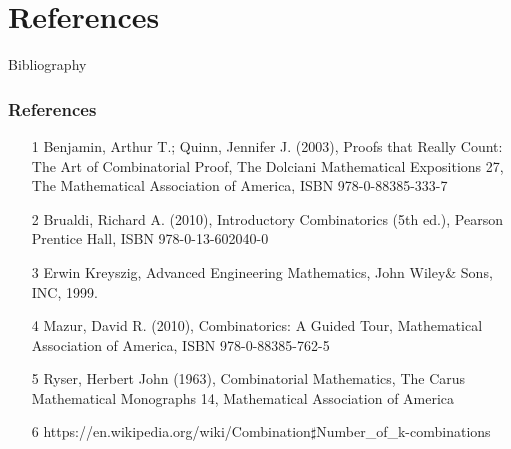 \documentclass{beamer}
\begin{document}
\section{References}
\begin{frame}{Bibliography}
\frametitle{References}
\begin{itemize}
\item[1]
Benjamin, Arthur T.; Quinn, Jennifer J. (2003), Proofs that Really Count: The Art of Combinatorial Proof, The Dolciani Mathematical Expositions 27, The Mathematical Association of America, ISBN 978-0-88385-333-7
\item[2]
Brualdi, Richard A. (2010), Introductory Combinatorics (5th ed.), Pearson Prentice Hall, ISBN 978-0-13-602040-0
\item[3]
Erwin Kreyszig, Advanced Engineering Mathematics, John Wiley\& Sons, INC, 1999.
\item[4]
Mazur, David R. (2010), Combinatorics: A Guided Tour, Mathematical Association of America, ISBN 978-0-88385-762-5
\item[5]
Ryser, Herbert John (1963), Combinatorial Mathematics, The Carus Mathematical Monographs 14, Mathematical Association of America
\item[6]
https://en.wikipedia.org/wiki/Combination$\sharp$Number\_of\_k-combinations
\end{itemize}
\end{frame}
\end{document}
